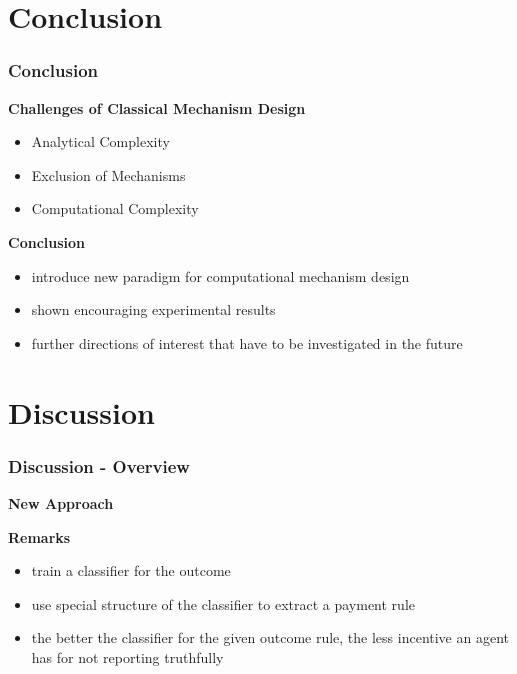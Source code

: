 \documentclass{beamer}
\begin{document}
\section{Conclusion}
\begin{frame}
	\frametitle{Conclusion}
	\textbf{Challenges of Classical Mechanism Design}
	\begin{itemize}
		\item Analytical Complexity
		\item Exclusion of Mechanisms
		\item Computational Complexity
	\end{itemize}
\bigskip

\pause
\textbf{Conclusion}
\begin{itemize}
	\item introduce new paradigm for computational mechanism design
	\item shown encouraging experimental results
	\item further directions of interest that have to be investigated in the future
\end{itemize}
 
 	
\end{frame}

\section{Discussion}
\begin{frame}
	\frametitle{Discussion - Overview}
	\textbf{New Approach}
	\begin{center}
		
	\end{center}

	\textbf{Remarks}
	\begin{itemize}
		\item train a classifier for the outcome
		\item use special structure of the classifier to extract a payment rule
		\item the better the classifier for the given outcome rule, the less incentive an agent has for not reporting truthfully
	\end{itemize}
\end{frame}


\end{document}
